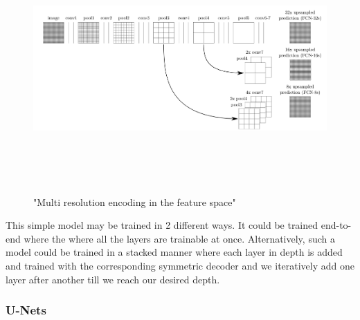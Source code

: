 \documentclass[19pt]{article}
\begin{document}
\begin{center}
    \begin{figure}[!h!t!b]
        \centerline{\includegraphics[width=175mm,height=95mm]{images/fcn.png}}
        \caption{"Multi resolution encoding in the feature space"}
        \label{fig:9}
    \end{figure}
\end{center}

 This simple model may be trained in 2 different ways. It could be trained end-to-end where the where all the layers are trainable at once. Alternatively, such a model could be trained in a stacked manner where each layer in depth is added and trained with the corresponding symmetric decoder and we iteratively add one layer after another till we reach our desired depth. 
\newpage 

\subsubsection{U-Nets}
\end{document}
